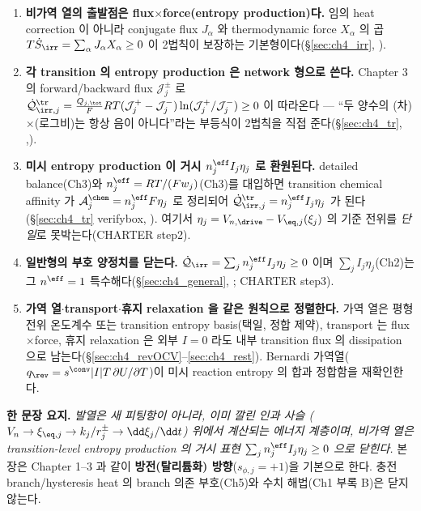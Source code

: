 \begin{enumerate}[label=\textbf{(\arabic*)},leftmargin=2.2em]
\item \textbf{비가역 열의 출발점은 flux$\times$force(entropy production)다.} 임의 heat correction 이 아니라
  conjugate flux $J_\alpha$ 와 thermodynamic force $X_\alpha$ 의 곱 $T\dot S_\irr=\sum_\alpha J_\alpha X_\alpha\ge0$
  이 2법칙이 보장하는 기본형이다(\S\ref{sec:ch4_irr}, ).
\item \textbf{각 transition 의 entropy production 은 network 형으로 쓴다.} Chapter 3 의 forward/backward
  flux $\mathcal J_j^\pm$ 로 $\dot{\mathcal Q}_{\irr,j}^{\tr}=\tfrac{Q_{j,\tot}}{F}RT(\mathcal J_j^+-\mathcal J_j^-)
  \ln(\mathcal J_j^+/\mathcal J_j^-)\ge0$ 이 따라온다 — ``두 양수의 (차)$\times$(로그비)는 항상 음이 아니다''라는
  부등식이 2법칙을 직접 준다(\S\ref{sec:ch4_tr}, ,).
\item \textbf{미시 entropy production 이 거시 $n_j^{\eff}I_j\eta_j$ 로 환원된다.} detailed balance(Ch3)와
  $n_j^{\eff}=RT/(Fw_j)$(Ch3)를 대입하면 transition chemical affinity 가 $\mathcal A_j^{\chem}=n_j^{\eff}F\eta_j$
  로 정리되어 $\dot{\mathcal Q}_{\irr,j}^{\tr}=n_j^{\eff}I_j\eta_j$ 가 된다(\S\ref{sec:ch4_tr} verifybox,
  ). 여기서 $\eta_j=V_{n,\drive}-V_{\eq,j}(\xi_j)$ 의 기준 전위를 \emph{단일}로 못박는다(CHARTER step2).
\item \textbf{일반형의 부호 양정치를 닫는다.} $\dot{\mathcal Q}_\irr=\sum_j n_j^{\eff}I_j\eta_j\ge0$ 이며
  $\sum_j I_j\eta_j$(Ch2)는 그 $n^{\eff}=1$ 특수해다(\S\ref{sec:ch4_general}, ; CHARTER step3).
\item \textbf{가역 열$\cdot$transport$\cdot$휴지 relaxation 을 같은 원칙으로 정렬한다.} 가역 열은 평형 전위
  온도계수 또는 transition entropy basis(택일, 정합 제약), transport 는 flux$\times$force, 휴지 relaxation 은
  외부 $I=0$ 라도 내부 transition flux 의 dissipation 으로 남는다(\S\ref{sec:ch4_revOCV}--\ref{sec:ch4_rest}).
  Bernardi 가역열($q_\rev=s^\conv|I|T\,\partial U/\partial T$)이 미시 reaction entropy 의 합과 정합함을
  재확인한다.
\end{enumerate}

\noindent\textbf{한 문장 요지.} \emph{발열은 새 피팅항이 아니라, 이미 깔린 인과 사슬
($V_n\to\xi_{\eq,j}\to k_j/r_j^\pm\to\dd\xi_j/\dd t$) 위에서 계산되는 에너지 계층이며, 비가역 열은
transition-level entropy production 의 거시 표현 $\sum_j n_j^{\eff}I_j\eta_j\ge0$ 으로 닫힌다.} 본 장은
Chapter 1--3 과 같이 \textbf{방전(탈리튬화) 방향}($s_{\phi,j}=+1$)을 기본으로 한다. 충전 branch/hysteresis
heat 의 branch 의존 부호(Ch5)와 수치 해법(Ch1 부록 B)은 닫지 않는다.

